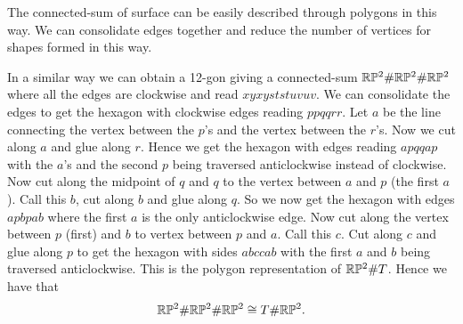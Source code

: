 \documentclass{article}
\begin{document}
\par
The connected-sum of surface can be easily described through polygons in this way. We can consolidate edges together and reduce the number of vertices for shapes formed in this way.
\begin{example}
  In a similar way we can obtain a 12-gon giving a connected-sum $ \mathbb{R}\mathbb P^2 \# \mathbb{R}\mathbb P^2 \#\mathbb{R}\mathbb P^2 $ where all the edges are clockwise and read $ xyxyststuvuv $. We can consolidate the edges to get the hexagon with clockwise edges reading $ ppqqrr $. Let $ a $ be the line connecting the vertex between the $ p $'s and the vertex between the $ r $'s. Now we cut along $ a $ and glue along $ r $. Hence we get the hexagon with edges reading $ apqqap $ with the $ a $'s and the second $ p $ being traversed anticlockwise instead of clockwise. Now cut along the midpoint of $ q $ and $ q $ to the vertex between $ a $ and $ p $ (the first $ a $). Call this $ b $, cut along $ b $ and glue along $ q $. So we now get the hexagon with edges $ apbpab $ where the first $ a $ is the only anticlockwise edge. Now cut along the vertex between $ p $ (first) and $ b $ to vertex between $ p $ and $ a $. Call this $ c $. Cut along $ c $ and glue along $ p $ to get the hexagon with sides $ abccab $ with the first $ a $ and $ b $ being traversed anticlockwise. This is the polygon representation of $ \mathbb{R}\mathbb P^2 \# T $. Hence we have that
  \[
    \mathbb{R}\mathbb P^2 \# \mathbb{R}\mathbb P^2 \# \mathbb{R}\mathbb P^2 \cong T \# \mathbb{R} \mathbb P^2. 
  \]
\end{example}
\end{document}
